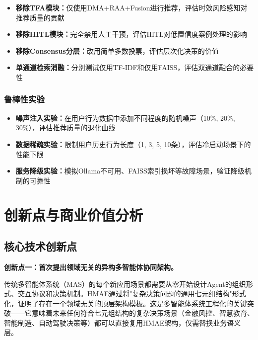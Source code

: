 \documentclass[11pt,a4paper]{ctexart}
\theoremstyle{remark}
\begin{document}
\begin{itemize}[nosep]
\item \textbf{移除TFA模块：}仅使用DMA+RAA+Fusion进行推荐，评估时效风险感知对推荐质量的贡献
\item \textbf{移除HITL模块：}完全禁用人工干预，评估HITL对低置信度案例处理的影响
\item \textbf{移除Consensus分层：}改用简单多数投票，评估层次化决策的价值
\item \textbf{单通道检索消融：}分别测试仅用TF-IDF和仅用FAISS，评估双通道融合的必要性
\end{itemize}

\subsubsection{鲁棒性实验}

\begin{itemize}[nosep]
\item \textbf{噪声注入实验：}在用户行为数据中添加不同程度的随机噪声（10\%, 20\%, 30\%），评估推荐质量的退化曲线
\item \textbf{数据稀疏实验：}限制用户历史行为长度（1, 3, 5, 10条），评估冷启动场景下的性能下限
\item \textbf{服务降级实验：}模拟Ollama不可用、FAISS索引损坏等故障场景，验证降级机制的可靠性
\end{itemize}

\newpage

\section{创新点与商业价值分析}

\subsection{核心技术创新点}

\textbf{创新点一：首次提出领域无关的异构多智能体协同架构。}

传统多智能体系统（MAS）的每个新应用场景都需要从零开始设计Agent的组织形式、交互协议和决策机制。HMAE通过将"复杂决策问题的通用七元组结构"形式化，证明了存在一个领域无关的顶层架构模板。这是多智能体系统工程化的关键突破——它意味着未来任何符合七元组结构的复杂决策场景（金融风控、智慧教育、智能制造、自动驾驶决策等）都可以直接复用HMAE架构，仅需替换业务语义层。
\end{document}
